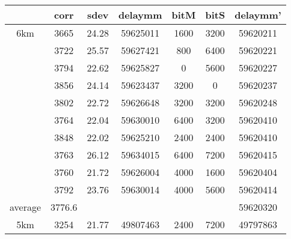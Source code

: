 \documentclass[a4paper,11pt]{article}
\newcommand{\sihao}{\fontsize{14pt}{21pt}\selectfont}       %
\newcommand{\xiaosi}{\fontsize{12pt}{18pt}\selectfont}      %
\begin{document}
\section{\sihao{测试结果}}
{\subsection{\xiaosi{实验数据}}

\begin{center}
\begin{tabular}{|c|c|c|c|c|c|c|}
\hline %
           & corr &       sdev &    delaymm &       bitM &       bitS &   delaymm' \\
\hline %
       6km &       3665 &      24.28 &   59625011 &       1600 &       3200 &   59620211 \\

           &       3722 &      25.57 &   59627421 &        800 &       6400 &   59620221 \\

           &       3794 &      22.62 &   59625827 &          0 &       5600 &   59620227 \\

           &       3856 &      24.14 &   59623437 &       3200 &          0 &   59620237 \\

           &       3802 &      22.72 &   59626648 &       3200 &       3200 &   59620248 \\

           &       3764 &      22.04 &   59630010 &       6400 &       3200 &   59620410 \\

           &       3848 &      22.02 &   59625210 &       2400 &       2400 &   59620410 \\

           &       3763 &      26.12 &   59634015 &       6400 &       7200 &   59620415 \\

           &       3760 &      21.72 &   59626004 &       4000 &       1600 &   59620404 \\

           &       3792 &      23.76 &   59630014 &       4000 &       5600 &   59620414 \\
\hline %
   average &     3776.6 &            &            &            &            &   59620320 \\
\hline %
       5km &       3254 &      21.77 &   49807463 &       2400 &       7200 &   49797863 \\


\end{tabular}
\end{center}}
\end{document}
